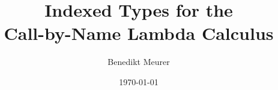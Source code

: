 \documentclass[12pt,a4paper,draft]{article}
\theoremstyle{definition}
\theoremstyle{plain}
\begin{document}
\author{Benedikt Meurer}
\date{\today}
\title{Indexed Types for the\\Call-by-Name Lambda Calculus}
\maketitle
\end{document}
